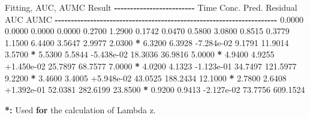 \documentclass[
  12pt,
]{krantz}
\newenvironment{Shaded}{\begin{snugshade}}{\end{snugshade}}
\newcommand{\ControlFlowTok}[1]{\textcolor[rgb]{0.13,0.29,0.53}{\textbf{#1}}}
\newcommand{\ErrorTok}[1]{\textcolor[rgb]{0.64,0.00,0.00}{\textbf{#1}}}
\newcommand{\FloatTok}[1]{\textcolor[rgb]{0.00,0.00,0.81}{#1}}
\newcommand{\NormalTok}[1]{#1}
\newcommand{\OperatorTok}[1]{\textcolor[rgb]{0.81,0.36,0.00}{\textbf{#1}}}
\newcommand{\StringTok}[1]{\textcolor[rgb]{0.31,0.60,0.02}{#1}}
\begin{document}
\begin{Shaded}
\begin{Highlighting}[]
\NormalTok{Fitting, AUC, AUMC Result}
\OperatorTok{{-}{-}{-}{-}{-}{-}{-}{-}{-}{-}{-}{-}{-}{-}{-}{-}{-}{-}{-}{-}{-}{-}{-}{-}{-}}
\StringTok{      }\NormalTok{Time         Conc.      Pred.   Residual       AUC       AUMC}
\OperatorTok{{-}{-}{-}{-}{-}{-}{-}{-}{-}{-}{-}{-}{-}{-}{-}{-}{-}{-}{-}{-}{-}{-}{-}{-}{-}{-}{-}{-}{-}{-}{-}{-}{-}{-}{-}{-}{-}{-}{-}{-}{-}{-}{-}{-}{-}{-}{-}{-}{-}{-}{-}{-}{-}{-}{-}{-}{-}{-}{-}{-}{-}{-}{-}{-}{-}{-}{-}{-}{-}}
\StringTok{     }\FloatTok{0.0000}       \FloatTok{0.0000}                           \FloatTok{0.0000}     \FloatTok{0.0000}
     \FloatTok{0.2700}       \FloatTok{1.2900}                           \FloatTok{0.1742}     \FloatTok{0.0470}
     \FloatTok{0.5800}       \FloatTok{3.0800}                           \FloatTok{0.8515}     \FloatTok{0.3779}
     \FloatTok{1.1500}       \FloatTok{6.4400}                           \FloatTok{3.5647}     \FloatTok{2.9977}
     \FloatTok{2.0300} \OperatorTok{*}\StringTok{     }\FloatTok{6.3200}     \FloatTok{6.3928} \FloatTok{{-}7.284e{-}02}     \FloatTok{9.1791}    \FloatTok{11.9014}
     \FloatTok{3.5700} \OperatorTok{*}\StringTok{     }\FloatTok{5.5300}     \FloatTok{5.5844} \FloatTok{{-}5.438e{-}02}    \FloatTok{18.3036}    \FloatTok{36.9816}
     \FloatTok{5.0000} \OperatorTok{*}\StringTok{     }\FloatTok{4.9400}     \FloatTok{4.9255} \FloatTok{+1.450e{-}02}    \FloatTok{25.7897}    \FloatTok{68.7577}
     \FloatTok{7.0000} \OperatorTok{*}\StringTok{     }\FloatTok{4.0200}     \FloatTok{4.1323} \FloatTok{{-}1.123e{-}01}    \FloatTok{34.7497}   \FloatTok{121.5977}
     \FloatTok{9.2200} \OperatorTok{*}\StringTok{     }\FloatTok{3.4600}     \FloatTok{3.4005} \FloatTok{+5.948e{-}02}    \FloatTok{43.0525}   \FloatTok{188.2434}
    \FloatTok{12.1000} \OperatorTok{*}\StringTok{     }\FloatTok{2.7800}     \FloatTok{2.6408} \FloatTok{+1.392e{-}01}    \FloatTok{52.0381}   \FloatTok{282.6199}
    \FloatTok{23.8500} \OperatorTok{*}\StringTok{     }\FloatTok{0.9200}     \FloatTok{0.9413} \FloatTok{{-}2.127e{-}02}    \FloatTok{73.7756}   \FloatTok{609.1524}

\OperatorTok{*}\ErrorTok{:}\StringTok{ }\NormalTok{Used }\ControlFlowTok{for}\NormalTok{ the calculation of Lambda z.}



\end{Highlighting}
\end{Shaded}
\end{document}
